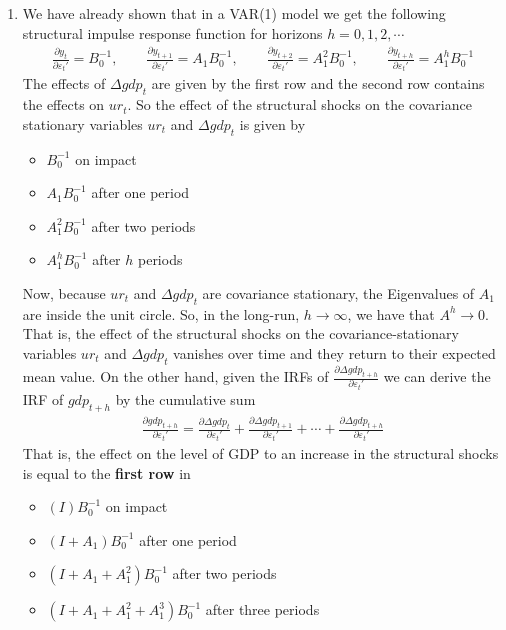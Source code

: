 \begin{enumerate}
\item We have already shown that in a VAR(1) model we get the following structural impulse response function for horizons \(h=0,1,2,\cdots \)
\begin{align*}
    \frac{\partial y_t}{\partial \varepsilon_t'} = B_0^{-1}
    ,\qquad
    \frac{\partial y_{t+1}}{\partial \varepsilon_t'} = A_1 B_0^{-1}
    ,\qquad
    \frac{\partial y_{t+2}}{\partial \varepsilon_t'} = A^2_1 B_0^{-1}
    ,\qquad
    \frac{\partial y_{t+h}}{\partial \varepsilon_t'} = A^h_1 B_0^{-1}
\end{align*}
The effects of \(\Delta gdp_t\) are given by the first row and the second row contains the effects on \(ur_t\).
So the effect of the structural shocks on the covariance stationary variables \(ur_t\) and \(\Delta gdp_t\) is given by
\begin{itemize}
    \item \(B_0^{-1}\) on impact
    \item \(A_1 B_0^{-1}\) after one period
    \item \(A_1^2 B_0^{-1}\) after two periods
    \item \(A_1^h B_0^{-1}\) after \(h\) periods
\end{itemize}
Now, because \(ur_t\) and \(\Delta gdp_t\) are covariance stationary,
  the Eigenvalues of \(A_1\) are inside the unit circle.
So, in the long-run, \(h\rightarrow \infty \), we have that \(A^h\rightarrow 0\).
That is, the effect of the structural shocks on the covariance-stationary variables \(ur_t\) and \(\Delta gdp_t\) vanishes over time
  and they return to their expected mean value.
On the other hand, given the IRFs of \(\frac{\partial \Delta gdp_{t+h}}{\partial \varepsilon_t'}\)
  we can derive the IRF of \(gdp_{t+h}\) by the cumulative sum
\begin{align*}
\frac{\partial gdp_{t+h}}{\partial \varepsilon_t'} = \frac{\partial \Delta gdp_t}{\partial \varepsilon_t'} + \frac{\partial \Delta gdp_{t+1}}{\partial \varepsilon_t'} + \cdots  + \frac{\partial \Delta gdp_{t+h}}{\partial \varepsilon_t'}
\end{align*}
That is, the effect on the level of GDP to an increase in the structural shocks is equal to the \textbf{first row} in
\begin{itemize}
    \item \((I)B_0^{-1}\) on impact
    \item \((I+A_1) B_0^{-1}\) after one period
    \item \((I+A_1+A_1^2) B_0^{-1}\) after two periods
    \item \((I+A_1+A_1^2+A_1^3) B_0^{-1}\) after three periods

\end{itemize}
\end{enumerate}
